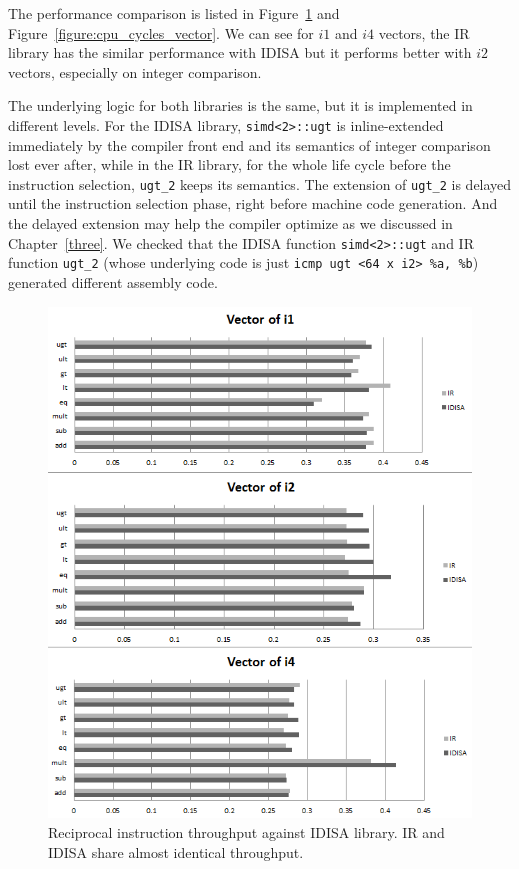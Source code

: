 The performance comparison is listed in Figure~\ref{figure:throughput_vector} and Figure~\ref{figure:cpu_cycles_vector}. We can see for $i1$ and $i4$ vectors, the IR library has the similar performance with IDISA but it performs better with $i2$ vectors, especially on integer comparison.

The underlying logic for both libraries is the same, but it is implemented in different levels. For the IDISA library, {\tt simd<2>::ugt} is inline-extended immediately by the compiler front end and its semantics of integer comparison lost ever after, while in the IR library, for the whole life cycle before the instruction selection, {\tt ugt\_2} keeps its semantics. The extension of {\tt ugt\_2} is delayed until the instruction selection phase, right before machine code generation. And the delayed extension may help the compiler optimize as we discussed in Chapter~\ref{three}. We checked that the IDISA function {\tt simd<2>::ugt} and IR function {\tt ugt\_2} (whose underlying code is just \verb|icmp ugt <64 x i2> %a, %b|) generated different assembly code.

\begin{figure}[htbp!]
\centering
\includegraphics[width=140mm]{draw/reciprocal_throughput_vector.png}
\caption[Reciprocal instruction throughput against IDISA library]{Reciprocal instruction throughput against IDISA library. IR and IDISA share almost identical throughput.}
\label{figure:throughput_vector}
\end{figure}

